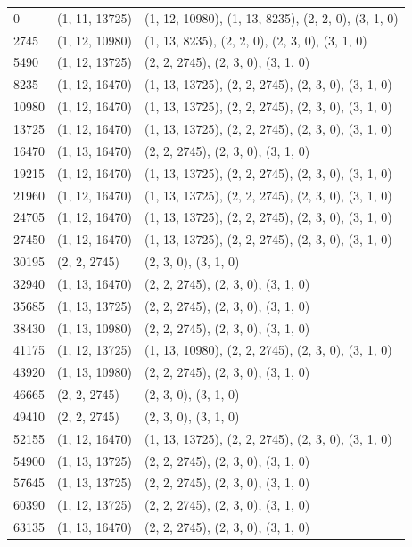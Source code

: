 \begin{longtable}{|l|l|l|}
	0 & (1, 11, 13725) & (1, 12, 10980), (1, 13, 8235), (2, 2, 0), (3, 1, 0) \\
	2745 & (1, 12, 10980) & (1, 13, 8235), (2, 2, 0), (2, 3, 0), (3, 1, 0) \\
	5490 & (1, 12, 13725) & (2, 2, 2745), (2, 3, 0), (3, 1, 0) \\
	8235 & (1, 12, 16470) & (1, 13, 13725), (2, 2, 2745), (2, 3, 0), (3, 1, 0) \\
	10980 & (1, 12, 16470) & (1, 13, 13725), (2, 2, 2745), (2, 3, 0), (3, 1, 0) \\
	13725 & (1, 12, 16470) & (1, 13, 13725), (2, 2, 2745), (2, 3, 0), (3, 1, 0) \\
	16470 & (1, 13, 16470) & (2, 2, 2745), (2, 3, 0), (3, 1, 0) \\
	19215 & (1, 12, 16470) & (1, 13, 13725), (2, 2, 2745), (2, 3, 0), (3, 1, 0) \\
	21960 & (1, 12, 16470) & (1, 13, 13725), (2, 2, 2745), (2, 3, 0), (3, 1, 0) \\
	24705 & (1, 12, 16470) & (1, 13, 13725), (2, 2, 2745), (2, 3, 0), (3, 1, 0) \\
	27450 & (1, 12, 16470) & (1, 13, 13725), (2, 2, 2745), (2, 3, 0), (3, 1, 0) \\
	30195 & (2, 2, 2745) & (2, 3, 0), (3, 1, 0) \\
	32940 & (1, 13, 16470) & (2, 2, 2745), (2, 3, 0), (3, 1, 0) \\
	35685 & (1, 13, 13725) & (2, 2, 2745), (2, 3, 0), (3, 1, 0) \\
	38430 & (1, 13, 10980) & (2, 2, 2745), (2, 3, 0), (3, 1, 0) \\
	41175 & (1, 12, 13725) & (1, 13, 10980), (2, 2, 2745), (2, 3, 0), (3, 1, 0) \\
	43920 & (1, 13, 10980) & (2, 2, 2745), (2, 3, 0), (3, 1, 0) \\
	46665 & (2, 2, 2745) & (2, 3, 0), (3, 1, 0) \\
	49410 & (2, 2, 2745) & (2, 3, 0), (3, 1, 0) \\
	52155 & (1, 12, 16470) & (1, 13, 13725), (2, 2, 2745), (2, 3, 0), (3, 1, 0) \\
	54900 & (1, 13, 13725) & (2, 2, 2745), (2, 3, 0), (3, 1, 0) \\
	57645 & (1, 13, 13725) & (2, 2, 2745), (2, 3, 0), (3, 1, 0) \\
	60390 & (1, 12, 13725) & (2, 2, 2745), (2, 3, 0), (3, 1, 0) \\
	63135 & (1, 13, 16470) & (2, 2, 2745), (2, 3, 0), (3, 1, 0) \\

\end{longtable}
